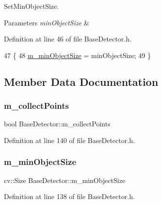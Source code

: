 Set\+Min\+Object\+Size. 


\begin{DoxyParams}{Parameters}
{\em min\+Object\+Size} & \\
\hline
\end{DoxyParams}


Definition at line 46 of file Base\+Detector.\+h.


\begin{DoxyCode}
47     \{
48         \mbox{\hyperlink{class_base_detector_a651b938c89c94daac4763728637d90c9}{m\_minObjectSize}} = minObjectSize;
49     \}
\end{DoxyCode}


\subsection{Member Data Documentation}
\mbox{\label{class_base_detector_a403cbf784fcb960bdb7d080c86c4a2ea}} 
\subsubsection{\texorpdfstring{m\+\_\+collect\+Points}{m\_collectPoints}}
{\footnotesize\ttfamily bool Base\+Detector\+::m\+\_\+collect\+Points\hspace{0.3cm}{\ttfamily [protected]}}



Definition at line 140 of file Base\+Detector.\+h.

\mbox{\label{class_base_detector_a651b938c89c94daac4763728637d90c9}} 
\subsubsection{\texorpdfstring{m\+\_\+min\+Object\+Size}{m\_minObjectSize}}
{\footnotesize\ttfamily cv\+::\+Size Base\+Detector\+::m\+\_\+min\+Object\+Size\hspace{0.3cm}{\ttfamily [protected]}}



Definition at line 138 of file Base\+Detector.\+h.

